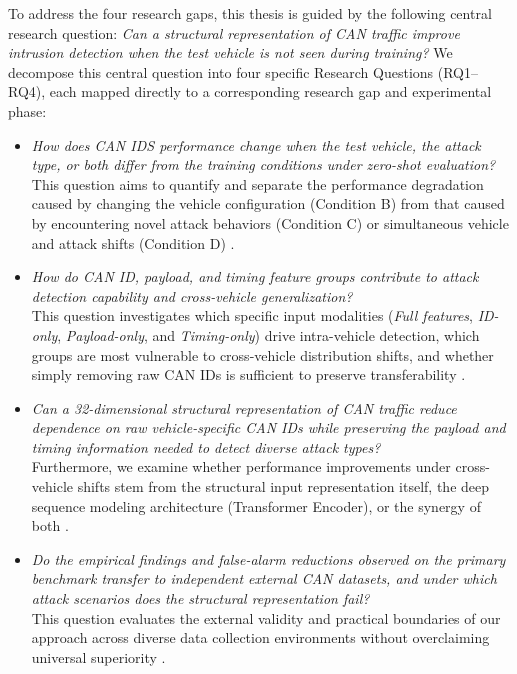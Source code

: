 \documentclass[12pt, a4paper, reqno, oneside]{book}
\begin{document}
To address the four research gaps, this thesis is guided by the following central research question: \textit{Can a structural representation of CAN traffic improve intrusion detection when the test vehicle is not seen during training?} We decompose this central question into four specific Research Questions (RQ1--RQ4), each mapped directly to a corresponding research gap and experimental phase:

\begin{itemize}
    \item \textit{How does CAN IDS performance change when the test vehicle, the attack type, or both differ from the training conditions under zero-shot evaluation?} \\
    This question aims to quantify and separate the performance degradation caused by changing the vehicle configuration (Condition B) from that caused by encountering novel attack behaviors (Condition C) or simultaneous vehicle and attack shifts (Condition D) \cite{lampe2023cantrain, lampe2024curated}.

    \item \textit{How do CAN ID, payload, and timing feature groups contribute to attack detection capability and cross-vehicle generalization?} \\
    This question investigates which specific input modalities (\textit{Full features}, \textit{ID-only}, \textit{Payload-only}, and \textit{Timing-only}) drive intra-vehicle detection, which groups are most vulnerable to cross-vehicle distribution shifts, and whether simply removing raw CAN IDs is sufficient to preserve transferability \cite{lee2017otids, islam2020graph}.

    \item \textit{Can a 32-dimensional structural representation of CAN traffic reduce dependence on raw vehicle-specific CAN IDs while preserving the payload and timing information needed to detect diverse attack types?} \\
    Furthermore, we examine whether performance improvements under cross-vehicle shifts stem from the structural input representation itself, the deep sequence modeling architecture (Transformer Encoder), or the synergy of both \cite{islam2020graph, meng2023gbids}.

    \item \textit{Do the empirical findings and false-alarm reductions observed on the primary benchmark transfer to independent external CAN datasets, and under which attack scenarios does the structural representation fail?} \\
    This question evaluates the external validity and practical boundaries of our approach across diverse data collection environments without overclaiming universal superiority \cite{dupont2019automotive, rajapaksha2024canmirgu, neto2024ciciov2024}.
\end{itemize}
\end{document}
